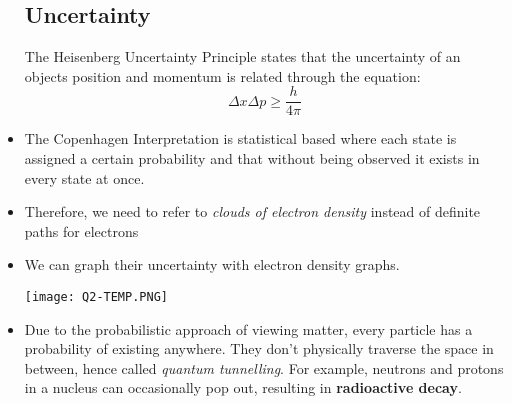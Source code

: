 \documentclass{article}
\begin{document}
\begin{itemize}
    \subsection{Uncertainty}
    \begin{idea}
        The Heisenberg Uncertainty Principle states that the uncertainty of an objects position and momentum is related through the equation:
        \begin{equation}
            \Delta x \Delta p \ge \frac{h}{4\pi}
        \end{equation}
    \end{idea}
    \item The Copenhagen Interpretation is statistical based where each state is assigned a certain probability and that without being observed it exists in every state at once.
    \item Therefore, we need to refer to \textit{clouds of electron density} instead of definite paths for electrons
    \item We can graph their uncertainty with electron density graphs.
    \begin{center}\texttt{[image: Q2-TEMP.PNG]}\end{center}
    \item Due to the probabilistic approach of viewing matter, every particle has a probability of existing anywhere. They don't physically traverse the space in between, hence called \textit{quantum tunnelling}. For example, neutrons and protons in a nucleus can occasionally pop out, resulting in \textbf{radioactive decay}.

\end{itemize}
\end{document}
